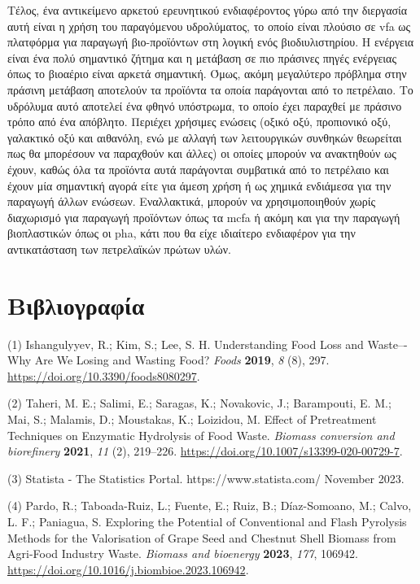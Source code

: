 \documentclass[11pt]{report}
\begin{document}
Τέλος, ένα αντικείμενο αρκετού ερευνητικού ενδιαφέροντος γύρω από την διεργασία αυτή είναι η χρήση του παραγόμενου υδρολύματος, το οποίο είναι πλούσιο σε \acrfull{vfa} ως πλατφόρμα για παραγωγή βιο-προϊόντων στη λογική ενός βιοδιυλιστηρίου. Η ενέργεια είναι ένα πολύ σημαντικό ζήτημα και η μετάβαση σε πιο πράσινες πηγές ενέργειας όπως το βιοαέριο είναι αρκετά σημαντική. Όμως, ακόμη μεγαλύτερο πρόβλημα στην πράσινη μετάβαση αποτελούν τα προϊόντα τα οποία παράγονται από το πετρέλαιο. Το υδρόλυμα αυτό αποτελεί ένα φθηνό υπόστρωμα, το οποίο έχει παραχθεί με πράσινο τρόπο από ένα απόβλητο. Περιέχει χρήσιμες ενώσεις (οξικό οξύ, προπιονικό οξύ, γαλακτικό οξύ και αιθανόλη, ενώ με αλλαγή των λειτουργικών συνθηκών θεωρείται πως θα μπορέσουν να παραχθούν και άλλες) οι οποίες μπορούν να ανακτηθούν ως έχουν, καθώς όλα τα προϊόντα αυτά παράγονται συμβατικά από το πετρέλαιο και έχουν μία σημαντική αγορά είτε για άμεση χρήση ή ως χημικά ενδιάμεσα για την παραγωγή άλλων ενώσεων. Εναλλακτικά, μπορούν να χρησιμοποιηθούν χωρίς διαχωρισμό για παραγωγή προϊόντων όπως τα \acrfull{mcfa} ή ακόμη και για την παραγωγή βιοπλαστικών όπως οι \acrfull{pha}, κάτι που θα είχε ιδιαίτερο ενδιαφέρον για την αντικατάσταση των πετρελαϊκών πρώτων υλών.

\part*{Βιβλιογραφία}
\label{sec:orgf13a13b}
\hypertarget{citeproc_bib_item_1}{(1) Ishangulyyev, R.; Kim, S.; Lee, S. H. Understanding Food Loss and Waste–-Why Are We Losing and Wasting Food? \textit{Foods} \textbf{2019}, \textit{8} (8), 297. \url{https://doi.org/10.3390/foods8080297}.}

\hypertarget{citeproc_bib_item_2}{(2) Taheri, M. E.; Salimi, E.; Saragas, K.; Novakovic, J.; Barampouti, E. M.; Mai, S.; Malamis, D.; Moustakas, K.; Loizidou, M. Effect of Pretreatment Techniques on Enzymatic Hydrolysis of Food Waste. \textit{Biomass conversion and biorefinery} \textbf{2021}, \textit{11} (2), 219–226. \url{https://doi.org/10.1007/s13399-020-00729-7}.}

\hypertarget{citeproc_bib_item_3}{(3) Statista - The Statistics Portal. https://www.statista.com/ November 2023.}

\hypertarget{citeproc_bib_item_4}{(4) Pardo, R.; Taboada-Ruiz, L.; Fuente, E.; Ruiz, B.; Díaz-Somoano, M.; Calvo, L. F.; Paniagua, S. Exploring the Potential of Conventional and Flash Pyrolysis Methods for the Valorisation of Grape Seed and Chestnut Shell Biomass from Agri-Food Industry Waste. \textit{Biomass and bioenergy} \textbf{2023}, \textit{177}, 106942. \url{https://doi.org/10.1016/j.biombioe.2023.106942}.}
\end{document}
